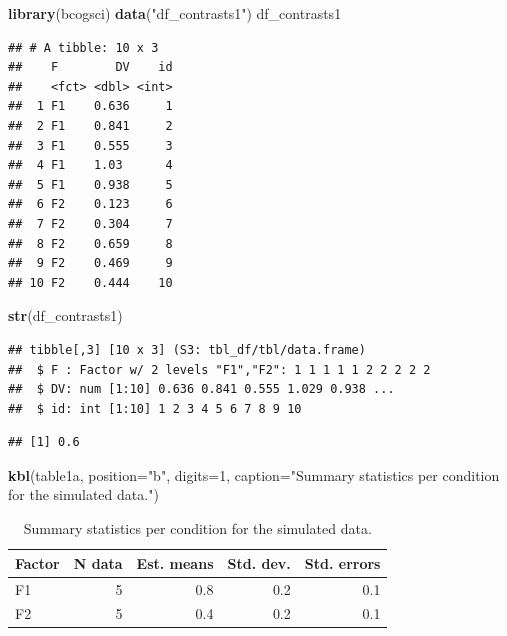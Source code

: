 \documentclass[12pt,]{krantz}
\newenvironment{Shaded}{\begin{snugshade}}{\end{snugshade}}
\newcommand{\DataTypeTok}[1]{\textcolor[rgb]{0.13,0.29,0.53}{#1}}
\newcommand{\DecValTok}[1]{\textcolor[rgb]{0.00,0.00,0.81}{#1}}
\newcommand{\KeywordTok}[1]{\textcolor[rgb]{0.13,0.29,0.53}{\textbf{#1}}}
\newcommand{\NormalTok}[1]{#1}
\newcommand{\StringTok}[1]{\textcolor[rgb]{0.31,0.60,0.02}{#1}}
\begin{document}
\begin{Shaded}
\begin{Highlighting}[]
\KeywordTok{library}\NormalTok{(bcogsci)}
\KeywordTok{data}\NormalTok{(}\StringTok{"df_contrasts1"}\NormalTok{) }
\NormalTok{df_contrasts1}
\end{Highlighting}
\end{Shaded}

\begin{verbatim}
## # A tibble: 10 x 3
##    F        DV    id
##    <fct> <dbl> <int>
##  1 F1    0.636     1
##  2 F1    0.841     2
##  3 F1    0.555     3
##  4 F1    1.03      4
##  5 F1    0.938     5
##  6 F2    0.123     6
##  7 F2    0.304     7
##  8 F2    0.659     8
##  9 F2    0.469     9
## 10 F2    0.444    10
\end{verbatim}

\begin{Shaded}
\begin{Highlighting}[]
\KeywordTok{str}\NormalTok{(df_contrasts1)}
\end{Highlighting}
\end{Shaded}

\begin{verbatim}
## tibble[,3] [10 x 3] (S3: tbl_df/tbl/data.frame)
##  $ F : Factor w/ 2 levels "F1","F2": 1 1 1 1 1 2 2 2 2 2
##  $ DV: num [1:10] 0.636 0.841 0.555 1.029 0.938 ...
##  $ id: int [1:10] 1 2 3 4 5 6 7 8 9 10
\end{verbatim}

\begin{verbatim}
## [1] 0.6
\end{verbatim}

\begin{Shaded}
\begin{Highlighting}[]
\KeywordTok{kbl}\NormalTok{(table1a, }\DataTypeTok{position=}\StringTok{"b"}\NormalTok{, }\DataTypeTok{digits=}\DecValTok{1}\NormalTok{, }
    \DataTypeTok{caption=}\StringTok{"Summary statistics per condition for the simulated data."}\NormalTok{)}
\end{Highlighting}
\end{Shaded}

\begin{table}[b]

\caption{\label{tab:cTab1Means}Summary statistics per condition for the simulated data.}
\centering
\begin{tabular}[t]{l|r|r|r|r}
\hline
Factor & N data & Est. means & Std. dev. & Std. errors\\
\hline
F1 & 5 & 0.8 & 0.2 & 0.1\\
\hline
F2 & 5 & 0.4 & 0.2 & 0.1\\
\hline
\end{tabular}
\end{table}
\end{document}
